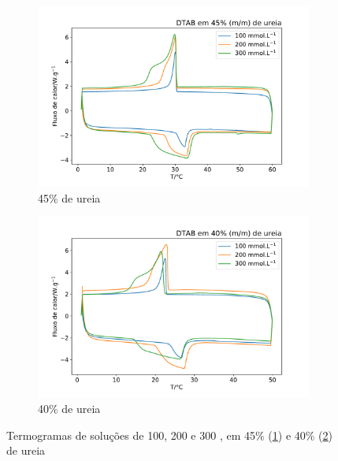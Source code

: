 	\begin{figure}[h]
		\centering
		\begin{subfigure}[t]{0.45\textwidth}
			\includegraphics[width=\textwidth]{./imagens/dsc/DTAB_45p}
			\caption{45\% de ureia}
			\label{fig:DSC_DTAB_UR45}
		\end{subfigure} \qquad %
		\begin{subfigure}[t]{0.45\textwidth}
			\includegraphics[width=\textwidth]{./imagens/dsc/DTAB_40p}
			\caption{40\% de ureia}
			\label{fig:DSC_DTAB_UR40}
		\end{subfigure}
		\caption{Termogramas de soluções de \DTAB{} 100, 200 e 300 \mM{}, em 45\% (\ref{fig:DSC_DTAB_UR45}) e 40\% (\ref{fig:DSC_DTAB_UR40}) de ureia}
		\label{fig:DSC_DTAB_UR_40-45}
	\end{figure}
	
